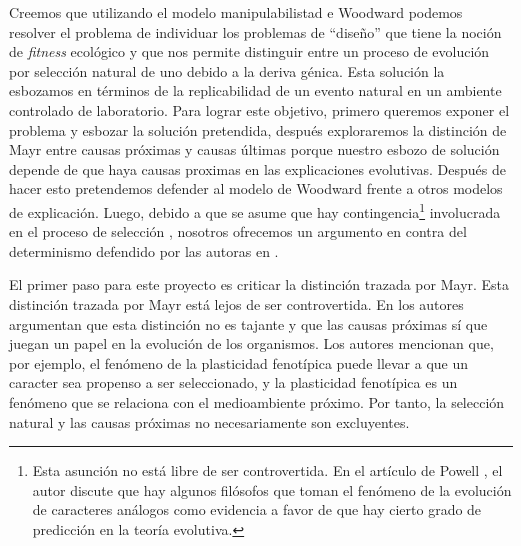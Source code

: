 Creemos que utilizando el modelo manipulabilistad e Woodward podemos resolver el problema de individuar los problemas de ``diseño''  que tiene la noción de \emph{fitness} ecológico \cite{Bouchard2004, sep-fitness} y que nos permite distinguir entre un proceso de evolución por selección natural de uno debido a la deriva génica. Esta solución la esbozamos en términos de la replicabilidad de un evento natural en un ambiente controlado de laboratorio. Para lograr este objetivo, primero queremos exponer el problema y esbozar la solución pretendida, después exploraremos la distinción de Mayr entre causas próximas y causas últimas porque nuestro esbozo de solución depende de que haya causas proximas en las explicaciones evolutivas. Después de hacer esto pretendemos defender al modelo de Woodward frente a otros modelos de explicación. Luego, debido a que se asume que hay contingencia\footnote{Esta asunción no está libre de ser controvertida. En el artículo de Powell \citeyear{Powell2012}, el autor discute que hay algunos filósofos que toman el fenómeno de la evolución de caracteres análogos como evidencia a favor de que hay cierto grado de predicción en la teoría evolutiva.} involucrada en el proceso de selección \cite{Scriven1959, Mayr1998}, nosotros ofrecemos un argumento en contra del determinismo defendido por las autoras en \cite{Graves1999}.


El primer paso para este proyecto es criticar la distinción trazada por Mayr. Esta distinción trazada por Mayr está lejos de ser controvertida. En \cite{Laland2011} los autores argumentan que esta distinción no es tajante y que las causas próximas sí que juegan un papel en la evolución de los organismos. Los autores mencionan que, por ejemplo, el fenómeno de la plasticidad fenotípica puede llevar a que un caracter sea propenso a ser seleccionado, y la plasticidad fenotípica es un fenómeno que se relaciona con el medioambiente próximo. Por tanto, la selección natural y las causas próximas no necesariamente son excluyentes.

